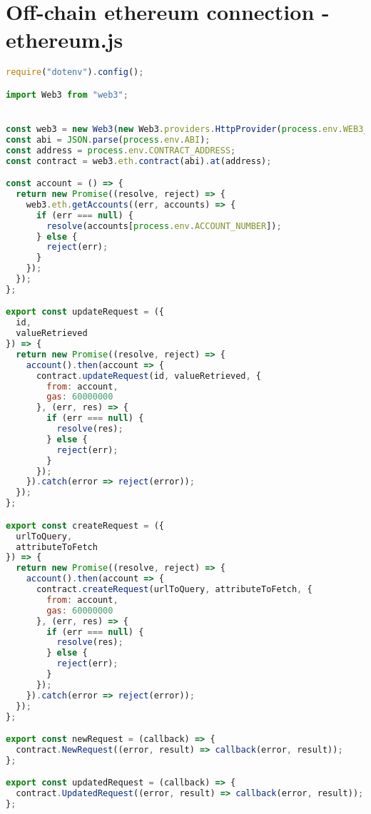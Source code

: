 \chapter{Off-chain ethereum connection - ethereum.js} \label{ap4:off-chain-ethereum-connection}

\begin{lstlisting}[language=JavaScript]
require("dotenv").config();

import Web3 from "web3";


const web3 = new Web3(new Web3.providers.HttpProvider(process.env.WEB3_PROVIDER_ADDRESS));
const abi = JSON.parse(process.env.ABI);
const address = process.env.CONTRACT_ADDRESS;
const contract = web3.eth.contract(abi).at(address);

const account = () => {
  return new Promise((resolve, reject) => {
    web3.eth.getAccounts((err, accounts) => {
      if (err === null) {
        resolve(accounts[process.env.ACCOUNT_NUMBER]);
      } else {
        reject(err);
      }
    });
  });
};

export const updateRequest = ({
  id,
  valueRetrieved
}) => {
  return new Promise((resolve, reject) => {
    account().then(account => {
      contract.updateRequest(id, valueRetrieved, {
        from: account,
        gas: 60000000
      }, (err, res) => {
        if (err === null) {
          resolve(res);
        } else {
          reject(err);
        }
      });
    }).catch(error => reject(error));
  });
};

export const createRequest = ({
  urlToQuery,
  attributeToFetch
}) => {
  return new Promise((resolve, reject) => {
    account().then(account => {
      contract.createRequest(urlToQuery, attributeToFetch, {
        from: account,
        gas: 60000000
      }, (err, res) => {
        if (err === null) {
          resolve(res);
        } else {
          reject(err);
        }
      });
    }).catch(error => reject(error));
  });
};

export const newRequest = (callback) => {
  contract.NewRequest((error, result) => callback(error, result));
};

export const updatedRequest = (callback) => {
  contract.UpdatedRequest((error, result) => callback(error, result));
};

\end{lstlisting}